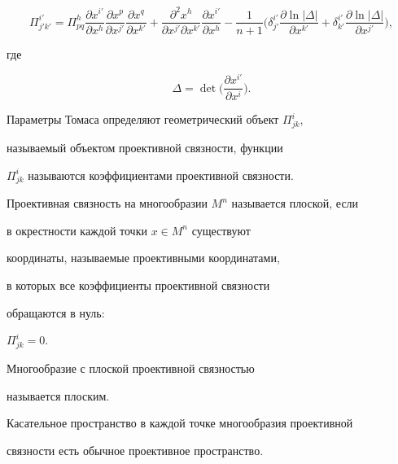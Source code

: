 \begin{equation}\label{transTom1}


\Pi ^{i'}_{j'k'} =\Pi ^{h}_{pq} \frac{\partial x^{i'}}{\partial


x^h} \frac{\partial x^{p}}{\partial x^{j'}} \frac{\partial x^{q}}{


\partial x^{k'}}+ \frac{\partial ^2 x^{h}}{\partial x^{j'}\partial


x^{k'}} \frac{\partial x^{i'}}{\partial x^h} -


\frac{1}{n+1} \bigg(\delta^{i'}_{j'}


\frac{\partial\ln | \Delta|}


{\partial x^{k'}}+ \delta^{i'}_{k'}


\frac{\partial \ln| \Delta|}{\partial x^{j'}}\bigg),


\end{equation}


где


\begin{equation}\label{transTom2}


\Delta =\det \bigg(


\frac{\partial x^{i'}}{\partial x^i}\bigg).


\end{equation}


Параметры Томаса определяют геометрический объект $\Pi^i_{jk}$,


называемый объектом проективной связности, функции


$\Pi^i_{jk}$ называются коэффициентами проективной связности.





Проективная связность на многообразии $ M^n$ называется { плоской}, если


в окрестности каждой точки $x\in M^n$ существуют


координаты, называемые { проективными координатами},


в которых все коэффициенты проективной связности


обращаются в нуль:


$\Pi^{i}_{jk} = 0$.


Многообразие с плоской проективной связностью


называется плоским.





Касательное пространство в каждой точке многообразия проективной


связности есть обычное проективное пространство.


